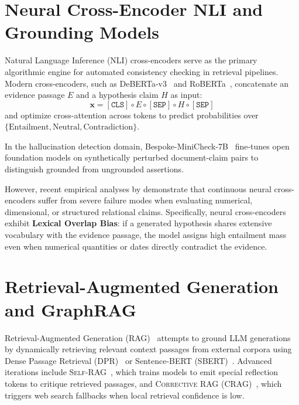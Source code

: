 \section{Neural Cross-Encoder NLI and Grounding Models}
\label{sec:cross_encoder_nli}

Natural Language Inference (NLI) cross-encoders serve as the primary algorithmic engine for automated consistency checking in retrieval pipelines. Modern cross-encoders, such as DeBERTa-v3~\cite{he2023deberta} and RoBERTa~\cite{liu2019roberta}, concatenate an evidence passage $E$ and a hypothesis claim $H$ as input:
\begin{equation}
    \mathbf{x} = [\texttt{CLS}] \circ E \circ [\texttt{SEP}] \circ H \circ [\texttt{SEP}]
\end{equation}
and optimize cross-attention across tokens to predict probabilities over $\{\text{Entailment}, \text{Neutral}, \text{Contradiction}\}$.

In the hallucination detection domain, Bespoke-MiniCheck-7B~\cite{niu2024ragtruth} fine-tunes open foundation models on synthetically perturbed document-claim pairs to distinguish grounded from ungrounded assertions. 

However, recent empirical analyses by \citet{fisch2026finground} demonstrate that continuous neural cross-encoders suffer from severe failure modes when evaluating numerical, dimensional, or structured relational claims. Specifically, neural cross-encoders exhibit \textbf{Lexical Overlap Bias}: if a generated hypothesis shares extensive vocabulary with the evidence passage, the model assigns high entailment mass even when numerical quantities or dates directly contradict the evidence.

\section{Retrieval-Augmented Generation and GraphRAG}
\label{sec:rag_and_graphrag}

Retrieval-Augmented Generation (RAG)~\cite{lewis2020retrieval} attempts to ground LLM generations by dynamically retrieving relevant context passages from external corpora using Dense Passage Retrieval (DPR)~\cite{karpukhin2020dense} or Sentence-BERT (SBERT)~\cite{reimers2019sentencebert}. Advanced iterations include \textsc{Self-RAG}~\cite{asai2024selfrag}, which trains models to emit special reflection tokens to critique retrieved passages, and \textsc{Corrective RAG (CRAG)}~\cite{yan2024corrective}, which triggers web search fallbacks when local retrieval confidence is low.

